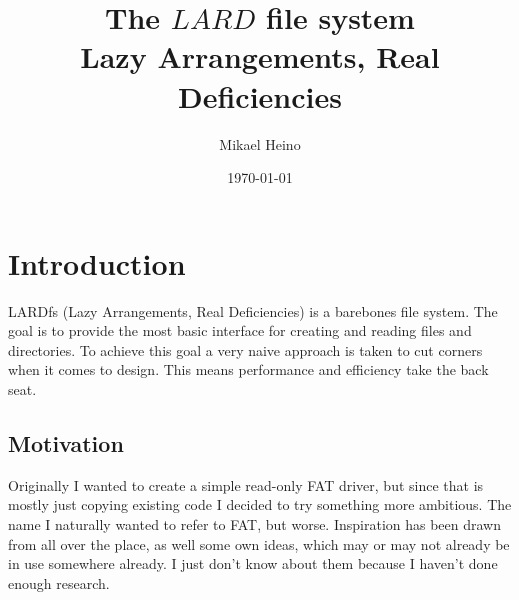 \documentclass{article}
\begin{document}
\title{%
		The $LARD$ file system \\
		\large Lazy Arrangements, Real Deficiencies}
\author{Mikael Heino}
\date{\today}

\maketitle

\section{Introduction}
LARDfs (Lazy Arrangements, Real Deficiencies) is a barebones file system.
The goal is to provide the most basic interface for creating and reading files and directories.
To achieve this goal a very naive approach is taken to cut corners when it comes to design.
This means performance and efficiency take the back seat.
\subsection{Motivation}
Originally I wanted to create a simple read-only FAT driver, but since that is mostly just copying existing code I decided to try something more ambitious.
The name I naturally wanted to refer to FAT, but worse.
Inspiration has been drawn from all over the place, as well some own ideas, which may or may not already be in use somewhere already.
I just don't know about them because I haven't done enough research.
\end{document}
